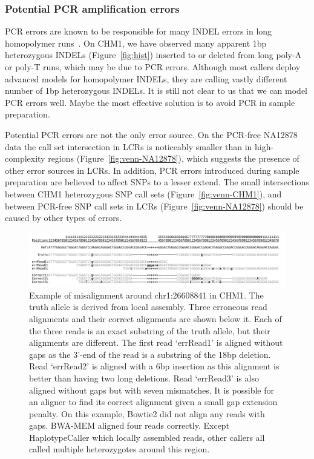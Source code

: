 \documentclass{bioinfo-ori}
\begin{document}
\subsubsection{Potential PCR amplification errors}
PCR errors are known to be responsible for many INDEL
errors in long homopolymer runs~\citep{1000g:2012aa}. On CHM1, we have observed many apparent 1bp
heterozygous INDELs (Figure~\ref{fig:hist}) inserted to or deleted from long
poly-A or poly-T runs, which may be due to PCR errors. Although most callers
deploy advanced models for homopolymer INDELs, they are calling vastly
different number of 1bp heterozygous INDELs. It is still not clear to us that
we can model PCR errors well. Maybe the most effective solution
is to avoid PCR in sample preparation.

Potential PCR errors are not the only error source. On the PCR-free NA12878 data
the call set intersection in LCRs is noticeably smaller than in high-complexity
regions (Figure~\ref{fig:venn-NA12878}), which suggests the presence of other
error sources in LCRs. In addition, PCR errors introduced during sample preparation are believed to affect
SNPs to a lesser extend. The small intersections between CHM1 heterozygous SNP
call sets (Figure~\ref{fig:venn-CHM1}), and between PCR-free SNP call sets in
LCRs (Figure~\ref{fig:venn-NA12878}) should be caused by other types of
errors.

\begin{figure}
\includegraphics[width=\textwidth]{indel-exam}
\caption{Example of misalignment around chr1:26608841 in CHM1. The truth allele
is derived from local assembly. Three erroneous read alignments and their
correct alignments are shown below it. Each of the three reads is an exact
substring of the truth allele, but their alignments are different.  The first
read `errRead1' is aligned without gaps as the 3'-end of the read is a
substring of the 18bp deletion.  Read `errRead2' is aligned with a 6bp
insertion as this alignment is better than having two long deletions. Read
`errRead3' is also aligned without gaps but with seven mismatches. It is
possible for an aligner to find its correct alignment given a small gap
extension penalty. On this example, Bowtie2 did not align any reads with gaps.
BWA-MEM aligned four reads correctly. Except HaplotypeCaller which locally
assembled reads, other callers all called multiple heterozygotes around this
region.}\label{fig:realign}
\end{figure}
\end{document}
